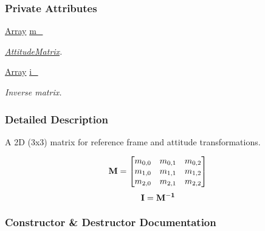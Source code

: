 \subsubsection*{Private Attributes}
\begin{DoxyCompactItemize}
\item 
\mbox{\label{classosse_1_1collaborate_1_1_attitude_matrix_a4431d81104329938ee7ba9dfc0b156e3}} 
\hyperlink{classosse_1_1collaborate_1_1_attitude_matrix_a0200c3caaa4dc8e80288a9608ef7ccd3}{Array} \hyperlink{classosse_1_1collaborate_1_1_attitude_matrix_a4431d81104329938ee7ba9dfc0b156e3}{m\+\_\+}
\begin{DoxyCompactList}\small\item\em \hyperlink{classosse_1_1collaborate_1_1_attitude_matrix}{Attitude\+Matrix}. \end{DoxyCompactList}\item 
\mbox{\label{classosse_1_1collaborate_1_1_attitude_matrix_a5c07ebb15fdf22ee7d47c0055068217a}} 
\hyperlink{classosse_1_1collaborate_1_1_attitude_matrix_a0200c3caaa4dc8e80288a9608ef7ccd3}{Array} \hyperlink{classosse_1_1collaborate_1_1_attitude_matrix_a5c07ebb15fdf22ee7d47c0055068217a}{i\+\_\+}
\begin{DoxyCompactList}\small\item\em Inverse matrix. \end{DoxyCompactList}\end{DoxyCompactItemize}


\subsubsection{Detailed Description}
A 2D (3x3) matrix for reference frame and attitude transformations. 

\[ {\bf{M}} = \begin{bmatrix} m_{0,0} & m_{0,1} & m_{0,2} \\ m_{1,0} & m_{1,1} & m_{1,2} \\ m_{2,0} & m_{2,1} & m_{2,2} \end{bmatrix} \] \[ \bf{I} = \bf{M}^{-1} \] 

\subsubsection{Constructor \& Destructor Documentation}
\mbox{\label{classosse_1_1collaborate_1_1_attitude_matrix_a0b360f9d96986756913036ff54f376d1}} 
